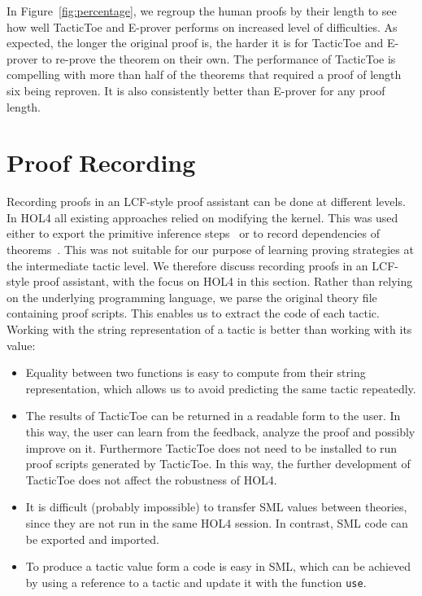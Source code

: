 \documentclass[runningheads,a4paper,draft]{svjour3}
\def\holfour{\textsf{HOL4}\xspace}
\def\eprover{\textsf{E-prover}\xspace}
\def\sml{\textsf{SML}\xspace}
\def\tactictoe{\textsf{TacticToe}\xspace}
\begin{document}
In Figure~\ref{fig:percentage}, we regroup the human proofs by their length to
see how well \tactictoe and \eprover performs on increased level of
difficulties. As expected, the longer the original proof is, the harder it is
for \tactictoe and \eprover to re-prove the theorem on their own.
The performance of \tactictoe is compelling with more than half of the theorems
that required a proof of length six being reproven. It is also consistently
better than \eprover for any proof length.


\section{Proof Recording}\label{sec:recording}
Recording proofs in an LCF-style proof assistant can be done at different
levels.
In \holfour all existing approaches relied on modifying the kernel. This was
used
either to export the primitive inference
steps~\cite{Wong95recordingand,DBLP:conf/itp/KumarH12}
or to record dependencies of theorems~\cite{tgck-cpp15}. This was not suitable
for our
purpose of learning proving strategies at the intermediate tactic level. We
therefore
discuss recording proofs in an LCF-style proof assistant, with the focus on
\holfour
in this section.
%
Rather than relying on the underlying programming language, we parse the
original theory file containing proof scripts. This enables us to extract the
code of each tactic.
Working with the string representation of a tactic is better than working with
its value:
\begin{itemize}
\item Equality between two functions is easy to compute from
their string representation, which allows us to avoid
predicting the same tactic repeatedly.
\item
The
results of
\tactictoe can be returned in a readable form to the user. In this way, the
user can learn from the feedback, analyze the proof and possibly improve on it.
Furthermore \tactictoe does not need to be installed to run
proof scripts generated by \tactictoe. In this way, the further development of
\tactictoe does not affect the robustness of \holfour.
\item
It is difficult (probably impossible) to transfer \sml values
between theories, since they are not run in the same \holfour session. In contrast,
\sml code can be exported and imported.
\item To produce a tactic value form a code is easy in \sml, which can be
achieved by using a reference to a tactic and update it with the function
\texttt{use}.
\end{itemize}
\end{document}
